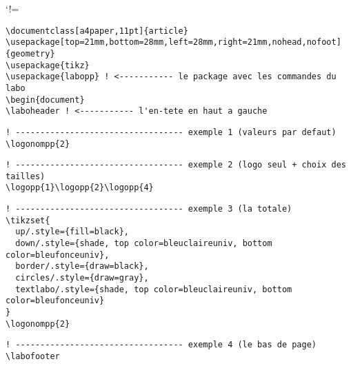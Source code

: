 \documentclass[a4paper,11pt]{article}
\begin{document}
\laboheader

\def\CommentChar{\char37}
\catcode`!=\active
\begin{Verbatim}[defineactive=\def!{\color{orange}\CommentChar}]
\documentclass[a4paper,11pt]{article}
\usepackage[top=21mm,bottom=28mm,left=28mm,right=21mm,nohead,nofoot]{geometry}
\usepackage{tikz}
\usepackage{labopp} ! <----------- le package avec les commandes du labo
\begin{document}
\laboheader ! <----------- l'en-tete en haut a gauche
\end{Verbatim}


\begin{Verbatim}[defineactive=\def!{\color{orange}\CommentChar}]
! ---------------------------------- exemple 1 (valeurs par defaut)
\logonompp{2}
\end{Verbatim}

\begin{Verbatim}[defineactive=\def!{\color{orange}\CommentChar}]
! ---------------------------------- exemple 2 (logo seul + choix des tailles)
\logopp{1}\logopp{2}\logopp{4}
\end{Verbatim}


\begin{Verbatim}[defineactive=\def!{\color{orange}\CommentChar}]
! ---------------------------------- exemple 3 (la totale)
\tikzset{
  up/.style={fill=black},
  down/.style={shade, top color=bleuclaireuniv, bottom color=bleufonceuniv},
  border/.style={draw=black},
  circles/.style={draw=gray},
  textlabo/.style={shade, top color=bleuclaireuniv, bottom color=bleufonceuniv}
}
\logonompp{2}
\end{Verbatim}
{ %
}


\vfill

\begin{Verbatim}[defineactive=\def!{\color{orange}\CommentChar}]
! ---------------------------------- exemple 4 (le bas de page)
\labofooter
\end{Verbatim}
\labofooter
\end{document}
